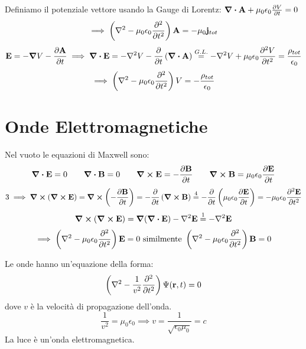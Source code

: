 \documentclass[12pt,a4paper]{article}
\begin{document}
Definiamo il potenziale vettore usando la Gauge di Lorentz: $\div{\vb{A}} + \mu_0\epsilon_0\pdv{V}{t}= 0$
\begin{equation*}
    \implies\left( \laplacian{}-\mu_0\epsilon_0\pdv[2]{}{t} \right)\vb{A}= -\mu_0\vb{j}_{tot}
\end{equation*}
\begin{equation*}
    \vb{E}= -\grad{V}-\pdv{\vb{A}}{t}\implies\div{\vb{E}}= -\laplacian{V}-\pdv{}{t}\left( \div{\vb{A}} \right)\overset{G.L.}{=}
    -\laplacian{V}+ \mu_0\epsilon_0\pdv[2]{V}{t}= \frac{\rho_{tot}}{\epsilon_0}
\end{equation*}
\begin{equation*}
    \implies \left( \laplacian{}-\mu_0\epsilon_0\pdv[2]{}{t} \right)V = -\frac{\rho_{tot}}{\epsilon_0}
\end{equation*}

\section{Onde Elettromagnetiche}
Nel vuoto le equazioni di Maxwell sono:
\begin{equation*}
    \div{\vb{E}}=0\qquad\div{\vb{B}}= 0\qquad\curl{\vb{E}}= -\pdv{\vb{B}}{t}\qquad\curl{\vb{B}}= \mu_0\epsilon_0\pdv{\vb{E}}{t}
\end{equation*}
\begin{equation*}
    3\implies\curl(\curl{\vb{E}})= \curl(-\pdv{\vb{B}}{t})= -\pdv{}{t}\left( \curl{\vb{B}} \right)\overset{4}{=}-\pdv{}{t}\left(\mu_0\epsilon_0\pdv{\vb{E}}{t}\right)=-\mu_0\epsilon_0\pdv[2]{\vb{E}}{t}
\end{equation*}
\begin{equation*}
    \curl(\curl{\vb{E}})= \grad(\div{\vb{E}})-\laplacian{\vb{E}}\overset{1}{=}-\laplacian{\vb{E}}
\end{equation*}
\begin{equation*}
    \implies \left( \laplacian{}-\mu_0\epsilon_0\pdv[2]{}{t} \right)\vb{E}= 0 \text{  similmente  } \left( \laplacian{}-\mu_0\epsilon_0\pdv[2]{}{t} \right)\vb{B}= 0
\end{equation*}


Le onde hanno un'equazione della forma:
\begin{equation*}
    \left( \laplacian{}-\frac{1}{v^2}\pdv[2]{}{t} \right)\Psi(\vb{r},t) = 0 
\end{equation*} 
dove $v$ è la velocità di propagazione dell'onda. 
\begin{equation*}
    \frac{1}{v^2}= \mu_0\epsilon_0\implies v = \frac{1}{\sqrt{\epsilon_0\mu_0}}= c
\end{equation*}
La luce è un'onda elettromagnetica.
\end{document}
